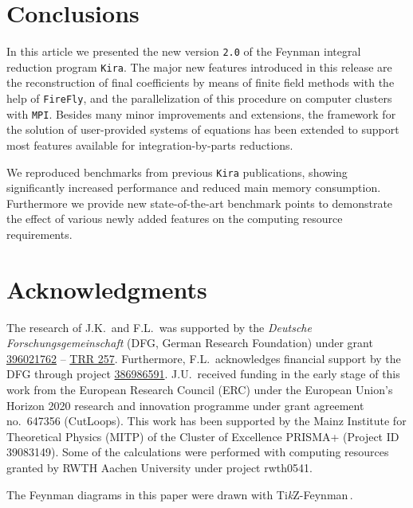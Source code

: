 \documentclass[11pt,a4paper,DIV=11,numbers=noenddot,parskip=half]{scrartcl}
\newcommand{\code}[1]{\texttt{#1}}
\newcommand*{\kira}{\code{Kira}}
\newcommand*{\firefly}{\code{FireFly}}
\newcommand*{\mpi}{\code{MPI}}
\begin{document}
\section{Conclusions}
\label{sect:conclusions}

In this article we presented the new version \code{2.0} of the Feynman integral reduction program \kira{}.
The major new features introduced in this release are the reconstruction of final coefficients by means of finite field methods with the help of \firefly{}, and the parallelization of this procedure on computer clusters with \mpi{}.
Besides many minor improvements and extensions, the framework for the solution of user-provided systems of equations has been extended to support most features available for integration-by-parts reductions.

We reproduced benchmarks from previous \kira{} publications, showing significantly increased performance and reduced main memory consumption.
Furthermore we provide new state-of-the-art benchmark points to demonstrate the effect of various newly added features on the computing resource requirements.


\section*{Acknowledgments}

The research of J.K.\ and F.L.\ was supported by the \textit{Deutsche Forschungsgemeinschaft} (DFG, German Research Foundation) under grant \href{http://gepris.dfg.de/gepris/projekt/396021762?language=en}{396021762} -- \href{http://p3h.particle.kit.edu/start}{TRR 257}.
Furthermore, F.L.\ acknowledges financial support by the DFG through project \href{http://gepris.dfg.de/gepris/projekt/386986591?language=en}{386986591}.
J.U.\ received funding in the early stage of this work from the European Research Council (ERC) under the European Union’s Horizon 2020 research and innovation programme under grant agreement no.\ 647356 (CutLoops).
This work has been supported by the Mainz Institute for Theoretical Physics (MITP) of the Cluster of Excellence PRISMA+ (Project ID 39083149).
Some of the calculations were performed with computing resources granted by RWTH Aachen University under project rwth0541.

The Feynman diagrams in this paper were drawn with Ti\textit{k}Z-Feynman\,\cite{Ellis:2016jkw}.

\appendix
\end{document}
